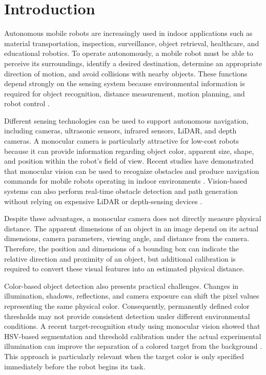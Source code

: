 \section{Introduction}
\label{sec:introduction}

Autonomous mobile robots are increasingly used in indoor applications such as material transportation, inspection, surveillance, object retrieval, healthcare, and educational robotics. To operate autonomously, a mobile robot must be able to perceive its surroundings, identify a desired destination, determine an appropriate direction of motion, and avoid collisions with nearby objects. These functions depend strongly on the sensing system because environmental information is required for object recognition, distance measurement, motion planning, and robot control \cite{liu2024sensing}.

Different sensing technologies can be used to support autonomous navigation, including cameras, ultrasonic sensors, infrared sensors, LiDAR, and depth cameras. A monocular camera is particularly attractive for low-cost robots because it can provide information regarding object color, apparent size, shape, and position within the robot's field of view. Recent studies have demonstrated that monocular vision can be used to recognize obstacles and produce navigation commands for mobile robots operating in indoor environments \cite{wang2021monocular}. Vision-based systems can also perform real-time obstacle detection and path generation without relying on expensive LiDAR or depth-sensing devices \cite{dang2023obstacle}.

Despite these advantages, a monocular camera does not directly measure physical distance. The apparent dimensions of an object in an image depend on its actual dimensions, camera parameters, viewing angle, and distance from the camera. Therefore, the position and dimensions of a bounding box can indicate the relative direction and proximity of an object, but additional calibration is required to convert these visual features into an estimated physical distance.

Color-based object detection also presents practical challenges. Changes in illumination, shadows, reflections, and camera exposure can shift the pixel values representing the same physical color. Consequently, permanently defined color thresholds may not provide consistent detection under different environmental conditions. A recent target-recognition study using monocular vision showed that HSV-based segmentation and threshold calibration under the actual experimental illumination can improve the separation of a colored target from the background \cite{jin2022target}. This approach is particularly relevant when the target color is only specified immediately before the robot begins its task.

